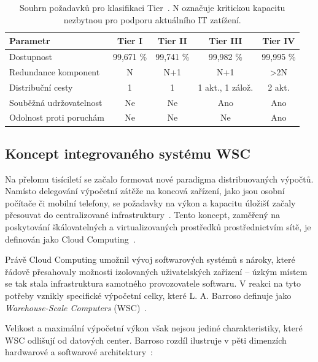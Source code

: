 \begin{table}[t] \centering \setlength{\tabcolsep}{4pt}
\begin{tabular}{|l|c|c|c|c|}
\hline
\textbf{Parametr} & \textbf{Tier I} & \textbf{Tier II} & \textbf{Tier III} & \textbf{Tier IV} \\ \hline
Dostupnost & 99,671 \% & 99,741 \% & 99,982 \% & 99,995 \% \\ \hline
Redundance komponent & N & N+1 & N+1 & >2N \\ \hline
Distribuční cesty & 1 & 1 & 1 akt., 1 zálož. & 2 akt. \\ \hline
Souběžná udržovatelnost & Ne & Ne & Ano & Ano \\ \hline
Odolnost proti poruchám & Ne & Ne & Ne & Ano \\ \hline
\end{tabular}
\caption{Souhrn požadavků pro klasifikaci Tier~\cite[s.~13]{turner_iv_tier_2006}. N označuje kritickou kapacitu nezbytnou pro podporu aktuálního IT zatížení.}
\label{tab:uptime_tiers}
\end{table}

\subsection{Koncept integrovaného systému WSC}
\label{subsec:wsc}

Na přelomu tisíciletí se začalo formovat nové paradigma distribuovaných výpočtů. Namísto delegování výpočetní zátěže na koncová zařízení, jako jsou osobní počítače či mobilní telefony, se požadavky na výkon a kapacitu úložišť začaly přesouvat do centralizované infrastruktury~\cite{barroso_data_2026}. Tento koncept, zaměřený na poskytování škálovatelných a virtualizovaných prostředků prostřednictvím sítě, je definován jako Cloud Computing~\cite{lewis_basics_2010}.

Právě Cloud Computing umožnil vývoj softwarových systémů s nároky, které řádově přesahovaly možnosti izolovaných uživatelských zařízení -- úzkým místem se tak stala infrastruktura samotného provozovatele softwaru. V reakci na tyto potřeby vznikly specifické výpočetní celky, které L. A. Barroso definuje jako \textit{Warehouse-Scale Computers} (WSC)~\cite{barroso_brief_2021, barroso_data_2026}.

Velikost a maximální výpočetní výkon však nejsou jediné charakteristiky, které WSC odlišují od datových center. Barroso rozdíl ilustruje v pěti dimenzích hardwarové a softwarové architektury~\cite[s. 2--4]{barroso_data_2026}:

